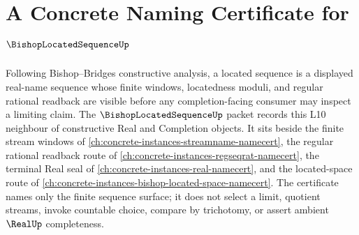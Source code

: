 \chapter{A Concrete Naming Certificate for $\BishopLocatedSequenceUp$}
\label{ch:concrete-instances-bishop-located-sequence-namecert}

Following Bishop--Bridges constructive analysis, a located sequence is a displayed real-name sequence whose finite windows, locatedness moduli, and regular rational readback are visible before any completion-facing consumer may inspect a limiting claim. The $\BishopLocatedSequenceUp$ packet records this L10 neighbour of constructive Real and Completion objects. It sits beside the finite stream windows of \autoref{ch:concrete-instances-streamname-namecert}, the regular rational readback route of \autoref{ch:concrete-instances-regseqrat-namecert}, the terminal Real seal of \autoref{ch:concrete-instances-real-namecert}, and the located-space route of \autoref{ch:concrete-instances-bishop-located-space-namecert}. The certificate names only the finite sequence surface; it does not select a limit, quotient streams, invoke countable choice, compare by trichotomy, or assert ambient $\RealUp$ completeness.


